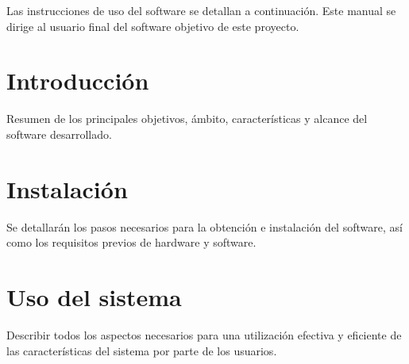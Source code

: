 

Las instrucciones de uso del software se detallan a continuación. Este manual se dirige al usuario final del software objetivo de este proyecto.

\section{Introducción}
Resumen de los principales objetivos, ámbito, características y alcance del software desarrollado.

\section{Instalación}
Se detallarán los pasos necesarios para la obtención e instalación del software, así como los requisitos previos de hardware y software.

\section{Uso del sistema}
Describir todos los aspectos necesarios para una utilización efectiva y eficiente de las características del sistema por parte de los usuarios.



